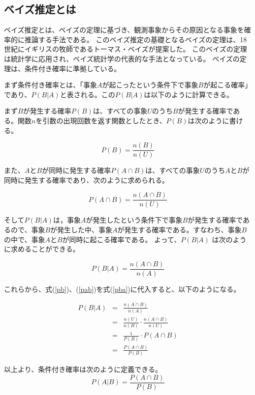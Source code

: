 \documentclass[11pt,a4j]{jsarticle}
\begin{document}
  \subsection{ベイズ推定とは}\label{sec:defbayes}
ベイズ推定とは、ベイズの定理に基づき、観測事象からその原因となる事象を確率的に推論する手法である。
このベイズ推定の基礎となるベイズの定理は、18世紀にイギリスの牧師であるトーマス・ベイズが提案した。
このベイズの定理は統計学に応用され、ベイズ統計学の代表的な手法となっている。
ベイズの定理は、条件付き確率に準拠している。

まず条件付き確率とは、「事象$A$が起こったという条件下で事象$B$が起こる確率」であり、$P(B|A)$と表される。この$P(B|A)$は以下のように計算できる。

まず$B$が発生する確率$P(B)$は、すべての事象$U$のうち$B$が発生する確率である。関数$n$を引数の出現回数を返す関数としたとき、$P(B)$は次のように書ける。

\begin{equation}
  P(B)=\frac{n(B)}{n(U)}
\label{pb}
\end{equation}

また、$A$と$B$が同時に発生する確率$P(A \cap B)$は、すべての事象$U$のうち$A$と$B$が同時に発生する確率であり、次のように求められる。

\begin{equation}
P(A \cap B)=\frac{n(A \cap B)}{n(U)}
\label{pab}
\end{equation}

そして$P(B|A)$は，事象$A$が発生したという条件下で事象$B$が発生する確率であるので、事象$B$が発生した中、事象$A$が発生する確率である。すなわち、事象$B$の中で、事象$A$と$B$が同時に起こる確率である。
よって、$P(B|A)$ は次のように求めることができる。

\begin{equation}
  P(B|A)=\frac{n(A \cap B)}{n(A)}
\label{pba}
\end{equation}

これらから、式(\ref{pb})、(\ref{pab})を式(\ref{pba})に代入すると、以下のようになる。

\begin{eqnarray*}
  P(B|A) & = & \frac{n(A \cap B)}{n(A)}\\
         & = & \frac{n(U)}{n(B)} \cdot \frac{n(A \cap B)}{n(U)} \\
         & = & \frac{1}{P(B)} \cdot P(A \cap B) \\
         & = & \frac{P(A \cap B)}{P(B)}
\end{eqnarray*}

以上より、条件付き確率は次のように定義できる。
\[
  P(A|B)=\frac{P(A \cap B)}{P(B)}
\]
\end{document}
